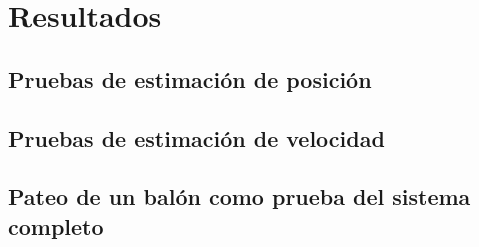 \chapter{Resultados}
\section{Pruebas de estimación de posición}
\section{Pruebas de estimación de velocidad}
\section{Pateo de un balón como prueba del sistema completo}